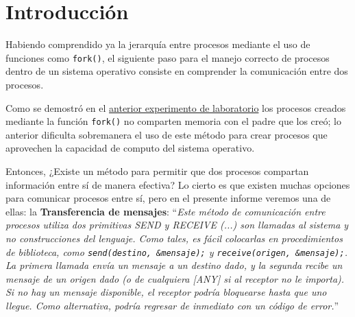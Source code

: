 \section{Introducción}
Habiendo comprendido ya la jerarquía entre procesos mediante el uso de funciones como \texttt{fork()}, el siguiente paso para el manejo correcto de procesos dentro de un sistema operativo consiste en comprender la comunicación entre dos procesos.

Como se demostró en el \href{https://github.com/ProgramsMFHM/ASIGNATURA-Introduccion-sistemas-operativos/tree/main/laboratorio2}{anterior experimento de laboratorio} los procesos creados mediante la función \texttt{fork()} no comparten memoria con el padre que los creó; lo anterior dificulta sobremanera el uso de este método para crear procesos que aprovechen la capacidad de computo del sistema operativo.

Entonces, ¿Existe un método para permitir que dos procesos compartan información entre sí de manera efectiva? Lo cierto es que existen muchas opciones para comunicar procesos entre sí, pero en el presente informe veremos una de ellas: la \textbf{Transferencia de mensajes}: ``\textit{Este método de comunicación entre procesos utiliza dos primitivas SEND y RECEIVE (...) son llamadas al sistema y no construcciones del lenguaje. Como tales, es fácil colocarlas en procedimientos de biblioteca, como \texttt{send(destino, \&mensaje);} y \texttt{receive(origen, \&mensaje);}.
La primera llamada envía un mensaje a un destino dado, y la segunda recibe un mensaje de un origen dado (o de cualquiera [ANY] si al receptor no le importa). Si no hay un mensaje disponible, el receptor podría bloquearse hasta que uno llegue. Como alternativa, podría regresar de inmediato con un código de error.}'' \parencite{tanenbaum1997sistemas}